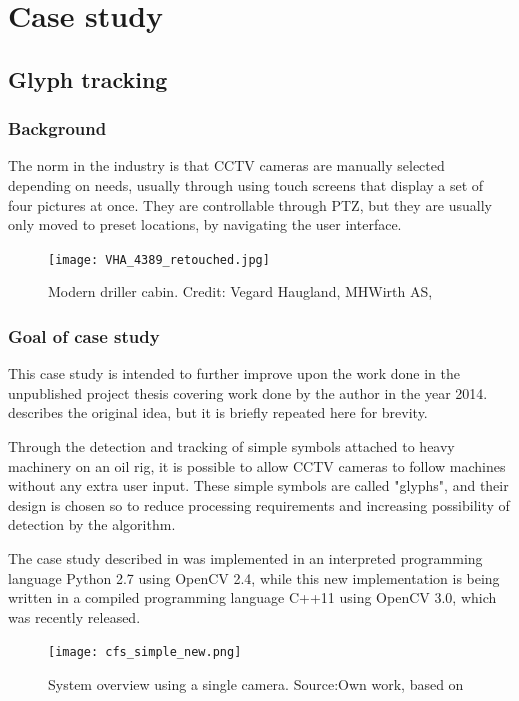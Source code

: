 \chapter{Case study}
\section{Glyph tracking}
\subsection{Background}

The norm in the industry is that CCTV cameras are manually selected depending on needs, usually through using touch screens that display a set of four pictures at once. They are controllable through PTZ, but they are usually only moved to preset locations, by navigating the user interface.

\begin{figure}[ht]
    \centering
    \texttt{[image: VHA\_4389\_retouched.jpg]}
    \caption{Modern driller cabin. Credit: Vegard Haugland, MHWirth AS, \citet{hauglandfoto15}}
    \label{fig:driller_cabin}
\end{figure}
\FloatBarrier

\subsection{Goal of case study}
This case study is intended to further improve upon the work done in the unpublished project thesis covering work done by the author in the year 2014. \citet{joakimsk14} describes the original idea, but it is briefly repeated here for brevity.

Through the detection and tracking of simple symbols attached to heavy machinery on an oil rig, it is possible to allow CCTV cameras to follow machines without any extra user input. These simple symbols are called "glyphs", and their design is chosen so to reduce processing requirements and increasing possibility of detection by the algorithm.

The case study described in \citet{joakimsk14} was implemented in an interpreted programming language Python 2.7 using OpenCV 2.4, while this new implementation is being written in a compiled programming language C++11 using OpenCV 3.0, which was recently released.

\begin{figure}[ht]
    \centering
    \texttt{[image: cfs\_simple\_new.png]}
    \caption{System overview using a single camera. Source:Own work, based on \citet{joakimsk14}}
    \label{fig:cfs_simple_new}
\end{figure}
\FloatBarrier


